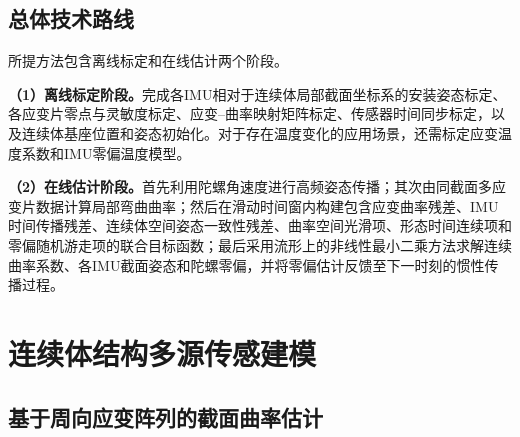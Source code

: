 \subsection{总体技术路线}

所提方法包含离线标定和在线估计两个阶段。

\textbf{（1）离线标定阶段。}完成各IMU相对于连续体局部截面坐标系的安装姿态标定、各应变片零点与灵敏度标定、应变--曲率映射矩阵标定、传感器时间同步标定，以及连续体基座位置和姿态初始化。对于存在温度变化的应用场景，还需标定应变温度系数和IMU零偏温度模型。

\textbf{（2）在线估计阶段。}首先利用陀螺角速度进行高频姿态传播；其次由同截面多应变片数据计算局部弯曲曲率；然后在滑动时间窗内构建包含应变曲率残差、IMU时间传播残差、连续体空间姿态一致性残差、曲率空间光滑项、形态时间连续项和零偏随机游走项的联合目标函数；最后采用流形上的非线性最小二乘方法求解连续曲率系数、各IMU截面姿态和陀螺零偏，并将零偏估计反馈至下一时刻的惯性传播过程。

\section{连续体结构多源传感建模}
\label{sec:multisensor_model}

\subsection{基于周向应变阵列的截面曲率估计}

